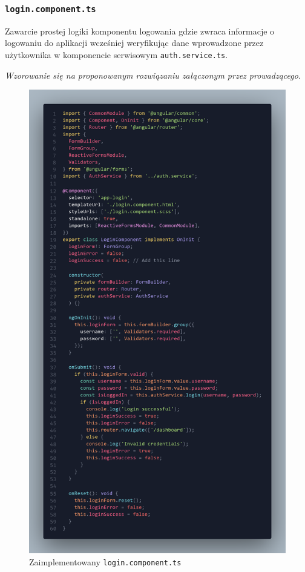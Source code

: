 \documentclass[12pt]{article}
\begin{document}
\subsubsection{\texttt{login.component.ts}}
Zawarcie prostej logiki komponentu logowania gdzie zwraca informacje o logowaniu do aplikacji wcześniej weryfikując dane wprowadzone przez użytkownika w komponencie serwisowym \texttt{auth.service.ts}.

\textit{Wzorowanie się na proponowanym rozwiązaniu załączonym przez prowadzącego.}
\begin{figure}[H]
  \centering
  \includegraphics[height=0.75\textheight,keepaspectratio]{image-7.png}
  \caption{Zaimplementowany \texttt{login.component.ts}}
  \label{fig:image-7}
\end{figure}
\end{document}
